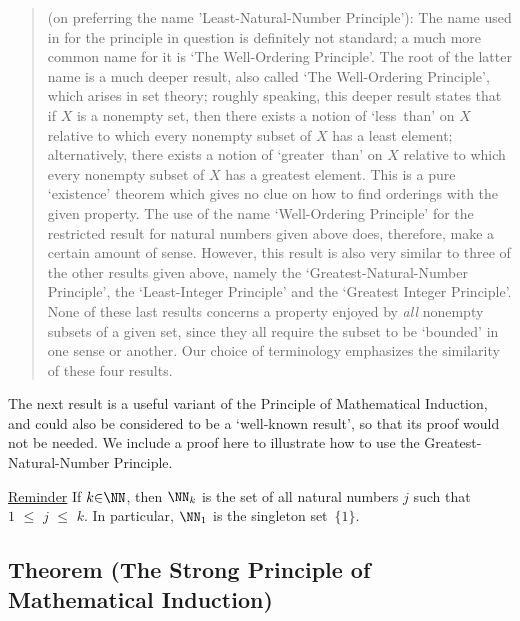 {\VV


\begin{quotation}
{\footnotesize \underline{\Note} (on preferring the name 'Least-Natural-Number Principle'):
        The name used in {\ThisText} for the principle in question is definitely not standard; a much more common name for it is `The Well-Ordering Principle'.
    The root of the latter name is a much deeper result, also called `The Well-Ordering Principle', which arises in set theory;
    roughly speaking, this deeper result states that if $X$ is a nonempty set, then there exists a notion of
    `less~than' on $X$ relative to which every nonempty subset of $X$ has a least element;
    alternatively, there exists a notion of `greater~than' on $X$ relative to which every nonempty subset of $X$ has a greatest element.
    This is a pure `existence' theorem which gives no clue on how to find orderings with the given property.
    The use of the name `Well-Ordering Principle' for the restricted result for natural numbers given above does, therefore, make a certain amount of sense.
    However, this result is also very similar to three of the other results given above,
    namely the `Greatest-Natural-Number Principle', the `Least-Integer Principle' and the `Greatest Integer Principle'.
    None of these last results concerns a property enjoyed by {\em all} nonempty  subsets of a given set,
    since they all require the subset to be `bounded' in one sense or another. Our choice of terminology emphasizes the similarity of these four results.
}%
\end{quotation}

\VV

        The next result is a useful variant of the Principle of Mathematical Induction,
    and could also be considered to be a `well-known result', so that its proof would not be needed.
    We include a proof here to illustrate how to use the Greatest-Natural-Number Principle.

\V

    \underline{Reminder} If $k{\in}{\NN}$, then ${\NN}_{k}$ is the set of all natural numbers $j$ such that $1\,\,{\leq}\,\,j\,\,{\leq}\,\,k$. In particular, ${\NN}_{1}$ is the singleton set~$\{1\}$.

\V

            \subsection{\small {\bf Theorem} (The Strong Principle of Mathematical Induction)}
            \label{ThmA20.04A}

}
